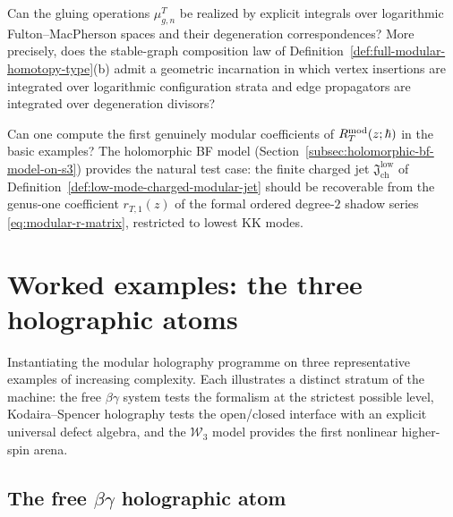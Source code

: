 \begin{problem}[Geometry]
Can the gluing operations $\mu_{g,n}^T$ be realized by explicit integrals over logarithmic
Fulton--MacPherson spaces \cite{Mok25} and their degeneration correspondences? More
precisely, does the stable-graph composition law of
Definition~\ref{def:full-modular-homotopy-type}\textup{(b)} admit a geometric incarnation in
which vertex insertions are integrated over logarithmic configuration strata and edge
propagators are integrated over degeneration divisors?
\end{problem}

\begin{problem}[Computation]
Can one compute the first genuinely modular coefficients of
$R_T^{\mathrm{mod}}(z;\hbar)$ in the basic examples? The holomorphic BF model
(Section~\ref{subsec:holomorphic-bf-model-on-s3}) provides the natural test case: the finite
charged jet $\mathfrak J_{\mathrm{ch}}^{\mathrm{low}}$ of
Definition~\ref{def:low-mode-charged-modular-jet} should be recoverable from the genus-one
coefficient $r_{T,1}(z)$ of the formal ordered degree-$2$ shadow series
\eqref{eq:modular-r-matrix}, restricted to lowest KK modes.
\end{problem}

\section{Worked examples: the three holographic atoms}

Instantiating the modular holography programme on three representative examples of
increasing complexity. Each illustrates a distinct stratum of the machine: the free
$\beta\gamma$ system tests the formalism at the strictest possible level, Kodaira--Spencer
holography tests the open/closed interface with an explicit universal defect algebra, and
the $\mathcal{W}_3$ model provides the first nonlinear higher-spin arena.

\subsection{The free \texorpdfstring{$\beta\gamma$}{betagamma} holographic atom}

